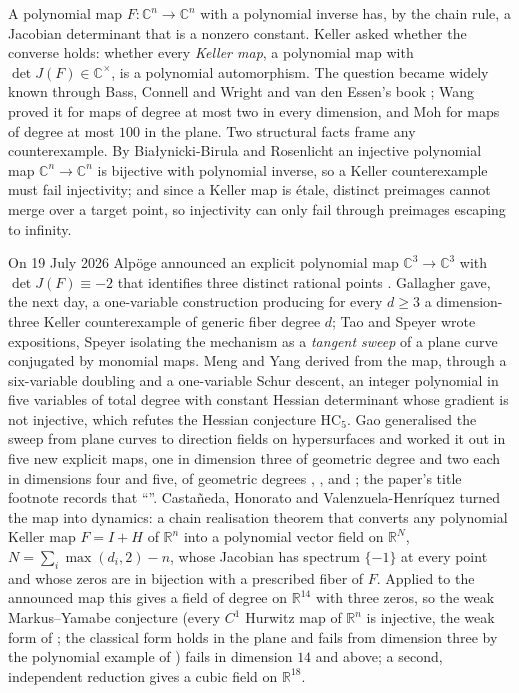 \documentclass[11pt]{article}
\newcommand{\C}{\mathbb{C}}
\begin{document}
A polynomial map $F\colon\C^n\to\C^n$ with a polynomial inverse has, by the chain rule, a
Jacobian determinant that is a nonzero constant. Keller \cite{Keller1939} asked whether the
converse holds: whether every \emph{Keller map}, a polynomial map with $\det J(F)\in\C^\times$,
is a polynomial automorphism. The question became widely known through Bass, Connell and Wright
\cite{BCW1982} and van den Essen's book \cite{Essen2000}; Wang \cite{Wang1980} proved it for maps
of degree at most two in every dimension, and Moh \cite{Moh1983} for maps of degree at most
$100$ in the plane. Two structural facts frame any counterexample. By Bia{\l}ynicki-Birula and
Rosenlicht \cite{BBR1962} an injective polynomial map $\C^n\to\C^n$ is bijective with polynomial
inverse, so a Keller counterexample must fail injectivity; and since a Keller map is \'etale,
distinct preimages cannot merge over a target point, so injectivity can only fail through
preimages escaping to infinity.

On 19 July 2026 Alp\"oge announced an explicit polynomial map $\C^3\to\C^3$ with
$\det J(F)\equiv-2$ that identifies three distinct rational points \cite{Alpoge2026}. Gallagher
\cite{Gallagher2026} gave, the next day, a one-variable construction producing for every
$d\ge3$ a dimension-three Keller counterexample of generic fiber degree $d$; Tao
\cite{Tao2026} and Speyer \cite{Speyer2026} wrote expositions, Speyer isolating the mechanism as
a \emph{tangent sweep} of a plane curve conjugated by monomial maps. Meng and Yang
\cite{MengYang2026} derived from the map, through a six-variable doubling and a one-variable
Schur descent, an integer polynomial in five variables of total degree \PsiDegree{} with
constant Hessian determinant \HessDet{} whose gradient is not injective, which refutes the
Hessian conjecture $\mathrm{HC}_5$. Gao \cite{Gao2026} generalised the sweep from plane curves
to direction fields on hypersurfaces and worked it out in five new explicit maps, one in dimension
three of geometric degree \FiberG{} and two each in dimensions four and five, of geometric degrees
\FiberFfour{}, \FiberFfive{}, \FiberFsix{} and \FiberFseven{}; the paper's title footnote records
that ``\GaoAiDisclosure''. Casta\~neda, Honorato and Valenzuela-Henr\'iquez \cite{CHV2026} turned
the map into dynamics: a chain realisation theorem that converts any polynomial Keller map
$F=I+H$ of $\mathbb{R}^n$ into a polynomial vector field on $\mathbb{R}^N$,
$N=\sum_i\max(d_i,2)-n$, whose Jacobian has spectrum $\{-1\}$ at every point and whose zeros
are in bijection with a prescribed fiber of $F$. Applied to the announced map this gives a field
of degree \XfourteenDeg{} on $\mathbb{R}^{14}$ with three zeros, so the weak Markus--Yamabe
conjecture (every $C^1$ Hurwitz map of $\mathbb{R}^n$ is injective, the weak form of
\cite{MarkusYamabe1960}; the classical form holds in the plane \cite{Fessler1995,Gutierrez1995}
and fails from dimension three by the polynomial example of \cite{Cima1997}) fails in dimension
$14$ and above; a second, independent reduction gives a cubic field on $\mathbb{R}^{18}$.
\end{document}
